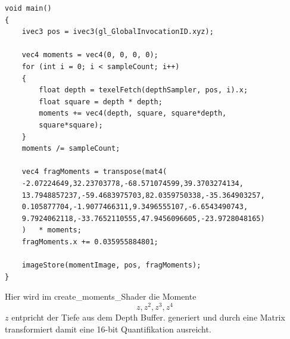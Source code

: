 \documentclass[runningheaders,a4paper]{llncs}
\begin{document}
\begin{lstlisting}
void main()
{
    ivec3 pos = ivec3(gl_GlobalInvocationID.xyz);

    vec4 moments = vec4(0, 0, 0, 0);
    for (int i = 0; i < sampleCount; i++)
    {
        float depth = texelFetch(depthSampler, pos, i).x;
        float square = depth * depth;
        moments += vec4(depth, square, square*depth, 
        square*square);
    }
    moments /= sampleCount;

	vec4 fragMoments = transpose(mat4(	
	-2.07224649,32.23703778,-68.571074599,39.3703274134,
    13.7948857237,-59.4683975703,82.0359750338,-35.364903257,
    0.105877704,-1.9077466311,9.3496555107,-6.6543490743,
    9.7924062118,-33.7652110555,47.9456096605,-23.9728048165)
    )	* moments;
	fragMoments.x += 0.035955884801;

    imageStore(momentImage, pos, fragMoments);
}
\end{lstlisting}

Hier wird im create\_moments\_Shader die Momente
$$
z, z^2, z^3, z^4
$$
$z$ entpricht der Tiefe aus dem Depth Buffer.
generiert und durch eine Matrix transformiert damit eine 16-bit Quantifikation ausreicht.
\end{document}
